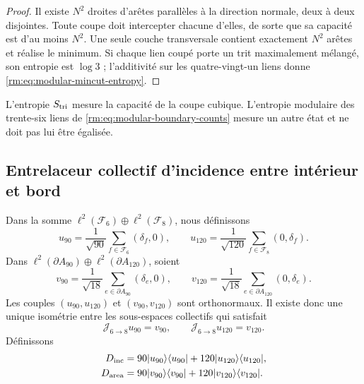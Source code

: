 \begin{proof}
Il existe \(N^2\) droites d'arêtes parallèles à la direction normale, deux à deux
disjointes. Toute coupe doit intercepter chacune d'elles, de sorte que sa capacité
est d'au moins \(N^2\). Une seule couche transversale contient exactement
\(N^2\) arêtes et réalise le minimum. Si chaque lien coupé porte un trit
maximalement mélangé, son entropie est \(\log3\) ; l'additivité sur les
quatre-vingt-un liens donne \cref{rm:eq:modular-mincut-entropy}.
\end{proof}

L'entropie \(S_{\rm tri}\) mesure la capacité de la coupe cubique.
L'entropie modulaire des trente-six liens de
\cref{rm:eq:modular-boundary-counts} mesure un autre état et ne doit pas lui être
égalisée.

\subsection{Entrelaceur collectif d'incidence entre intérieur et bord}

Dans la somme
\(\ell^2(\mathcal F_6)\oplus\ell^2(\mathcal F_8)\), nous définissons
\begin{equation}
\label{rm:eq:modular-u90-u120}
u_{90}=\frac1{\sqrt{90}}\sum_{f\in\mathcal F_6}(\delta_f,0),
\qquad
u_{120}=\frac1{\sqrt{120}}\sum_{f\in\mathcal F_8}(0,\delta_f).
\end{equation}
Dans
\(\ell^2(\partial A_{90})\oplus\ell^2(\partial A_{120})\), soient
\begin{equation}
\label{rm:eq:modular-v90-v120}
v_{90}=\frac1{\sqrt{18}}\sum_{e\in\partial A_{90}}(\delta_e,0),
\qquad
v_{120}=\frac1{\sqrt{18}}\sum_{e\in\partial A_{120}}(0,\delta_e).
\end{equation}
Les couples \((u_{90},u_{120})\) et \((v_{90},v_{120})\) sont orthonormaux.
Il existe donc une unique isométrie entre les sous-espaces collectifs
qui satisfait
\begin{equation}
\label{rm:eq:modular-J68}
\mathcal J_{6\to8}u_{90}=v_{90},
\qquad
\mathcal J_{6\to8}u_{120}=v_{120}.
\end{equation}
Définissons
\begin{align}
D_{\rm inc}
&=90|u_{90}\rangle\langle u_{90}|
+120|u_{120}\rangle\langle u_{120}|,
\label{rm:eq:modular-Dinc}\\
D_{\rm area}
&=90|v_{90}\rangle\langle v_{90}|
+120|v_{120}\rangle\langle v_{120}|.
\label{rm:eq:modular-Darea}
\end{align}

